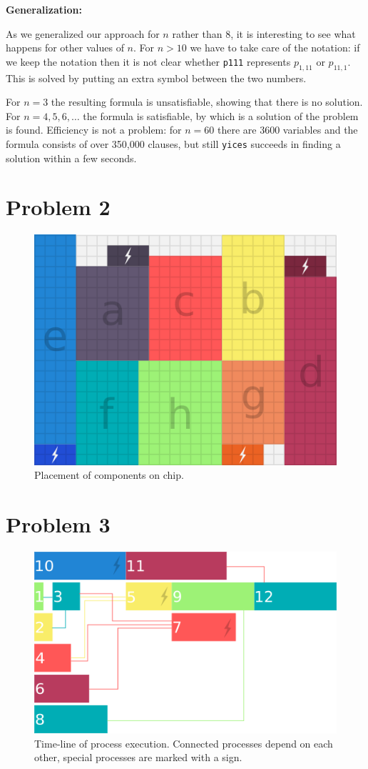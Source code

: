 \documentclass[a4paper]{article}
\begin{document}
\vspace{3mm}

{\bf Generalization:} 

As we generalized our approach for $n$ rather than 8, it is
interesting to see what happens for other values of $n$. For $n
> 10$ we have to take care of the notation: if we keep the
notation then it is not clear whether {\tt p111} represents 
$p_{1,11}$ or $p_{11,1}$. This is solved by putting an extra 
symbol between the two numbers. 

For $n=3$ the resulting formula is unsatisfiable, showing that
there is no solution. For $n = 4,5,6,\ldots$ the formula is
satisfiable, by which is a solution of the problem is found.
Efficiency is not a problem: for $n = 60$ there are 3600
variables and the formula consists of over 350,000 clauses, but 
still {\tt yices} succeeds in finding a solution within a few
seconds.
	\section{Problem 2}
	\begin{figure}[H]
		\centering
			\includegraphics[scale=0.5]{power-grid.png}
		\caption{Placement of components on chip.}
	\end{figure}
	\section{Problem 3}
	\begin{figure}[H]
		\centering
			\includegraphics[scale=0.7]{timeline.png}
		\caption{Time-line of process execution. Connected processes depend on each other, special processes are marked with a sign.}
	\end{figure}
\end{document}
